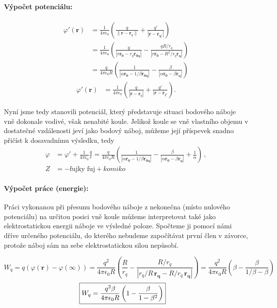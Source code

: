 \documentclass{article}
\newcommand{\vecvar}[1]{\boldsymbol{#1}}
\def\({\left(}
\def\){\right)}
\def\nlm{\\[5mm]}
\renewcommand{\vec}{\boldsymbol}
\begin{document}
		\paragraph{Výpočet potenciálu:}
			\begin{align*}
				\varphi'(\vecvar{r})
				&= \frac{1}{4 \pi \epsilon_0} \left( \frac{q}{\|\vec r - \vec r_q\|} + \frac{q'}{|\vecvar{r - r_{q'}}|} \right) \nlm
				&= \frac{1}{4 \pi \epsilon_0} \left( \frac{q}{|r \vecvar{r_0} - r_q \vecvar{r_{0q}}|} - \frac{qR/r_q}{|r \vecvar{r_0} - R^2/r_q \vecvar{r_q} |} \right) \nlm 
				&= \frac{q}{4 \pi \epsilon_0 R} \left( \frac{1}{|\alpha \vecvar{r_0} - 1/\beta \vecvar{r_{0q}}|} - \frac{\beta}{|\alpha \vecvar{r_0} - \beta \vecvar{r_q}| } \right)
			\end{align*}
			\begin{align*}
				\varphi'(\vec r)
				&= \frac{1}{4\pi\epsilon_0} \( \frac{q}{|\vec r - \vec r_q|} + \frac{q'}{|\vec r - \vec r_{q'}} \).
			\end{align*}
		
		Nyní jsme tedy stanovili potenciál, který představuje situaci bodového náboje vně dokonale vodivé, však nenabité koule. Jelikož koule se vně vlastního objemu v dostatečné vzdálenosti jeví jako bodový náboj, můžeme její příspevek snadno přičíst k dosavadnímu výsledku, tedy
		\begin{subequations}
			\begin{align}
				\varphi
				&= \varphi' + \frac{1}{4 \pi \epsilon_0} \frac{q}{r}
				= \frac{q}{4 \pi \epsilon_0 R} \left( \frac{1}{|\alpha \vecvar{r_0} - 1/\beta \vecvar{r_{0q}}|} - \frac{\beta}{|\alpha \vecvar{r_0} - \beta \vecvar{r_q}|} + \frac{1}{\alpha} \right) \, ,
			\\
				Z &= -\text{fujky fuj} + \textit{komiko}
			\end{align}	
		\end{subequations}
		
		\paragraph{Výpočet práce (energie):}
			Práci vykonanou při přesunu bodového náboje z nekonečna (místo nulového potenciálu) na určitou posici vně koule můžeme interpretovat také jako elektrostatickou energii náboje ve výsledné poloze. Spočteme ji pomocí námi dříve určeného potenciálu, do kterého nebudeme započítávat první člen v závorce, protože náboj sám na sebe elektrostatickou silou nepůsobí.
			
			\begin{equation*}
				W_q = q(\varphi(\vecvar{r}) - \varphi(\infty))
				= \frac{q^2}{4 \pi \epsilon_0 R} \left( \frac{R}{r_q} - \frac{R/r_q}{|r_q/R \, \vecvar{r_q} - R/r_q \, \vecvar{r_q}|} \right)
				= \frac{q^2}{4 \pi \epsilon_0 R} \left( \beta - \frac{\beta}{1/\beta - \beta} \right)
			\end{equation*}
			\begin{align*}
				\Aboxed{ W_q = \frac{q^2 \beta}{4 \pi \epsilon_0 R} \( 1 - \frac{\beta}{1 - \beta^2} \) }
			\end{align*}
			\newpage
			
\end{document}
